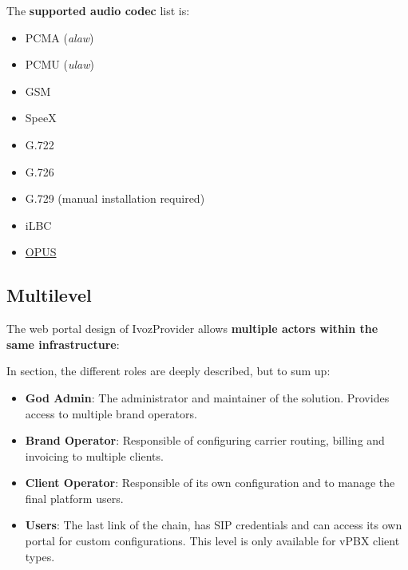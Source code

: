 \documentclass[letterpaper,10pt,english]{sphinxmanual}
\begin{document}
The \textbf{supported audio codec} list is:
\begin{itemize}
\item {} 
PCMA (\emph{alaw})

\item {} 
PCMU (\emph{ulaw})

\item {} 
GSM

\item {} 
SpeeX

\item {} 
G.722

\item {} 
G.726

\item {} 
G.729 (manual installation required)

\item {} 
iLBC

\item {} 
\href{http://opus-codec.org/}{OPUS}

\end{itemize}


\subsection{Multilevel}
\label{basic_concepts/intro/what_is_ivozprovider:multilevel}\label{basic_concepts/intro/what_is_ivozprovider:id1}
The web portal design of IvozProvider allows \textbf{multiple actors within the
same infrastructure}:

\noindent{}

In {\hyperref[basic_concepts/operation_roles/index:operation\string-roles]{}} section, the different roles are deeply
described, but to sum up:
\begin{itemize}
\item {} 
\textbf{God Admin}: The administrator and maintainer of the solution. Provides
access to multiple brand operators.

\item {} 
\textbf{Brand Operator}: Responsible of configuring carrier routing, billing and invoicing to
multiple clients.

\item {} 
\textbf{Client Operator}: Responsible of its own configuration and to manage the final platform users.

\item {} 
\textbf{Users}: The last link of the chain, has SIP credentials and can access
its own portal for custom configurations. This level is only available for vPBX client types.

\end{itemize}
\end{document}
